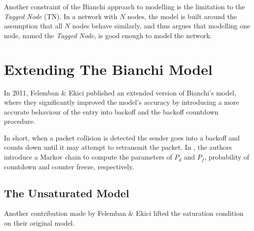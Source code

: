 Another constraint of the Bianchi approach to modelling is the limitation to the \emph{Tagged Node} (TN). In a network with $N$ nodes, the model is built around the assumption that all $N$ nodes behave similarly, and thus argues that modelling one node, named the \emph{Tagged Node}, is good enough to model the network.

\section{Extending The Bianchi Model}

In 2011, Felemban \& Ekici published an extended version of Bianchi's model, where they significantly improved the model's accuracy by introducing a more accurate behaviour of the entry into backoff and the backoff countdown procedure.

In short, when a packet collision is detected the sender goes into a backoff and counts down until it may attempt to retransmit the packet. In \cite{felemban}, the authors introduce a Markov chain to compute the parameters of $P_d$ and $P_f$, probability of countdown and counter freeze, respectively.

\subsection{The Unsaturated Model}

Another contribution made by Felemban \& Ekici lifted the saturation condition on their original model.
